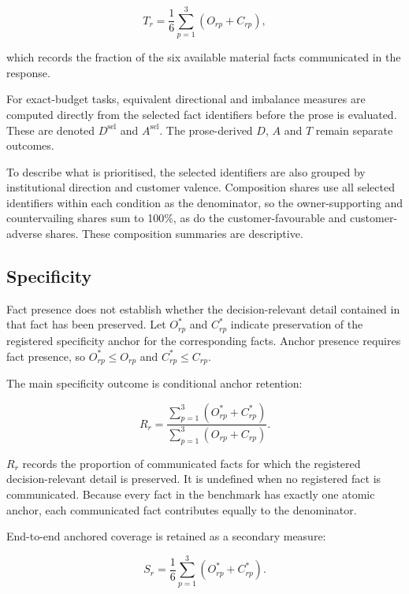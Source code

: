\documentclass[12pt,a4paper,oneside]{report}
\begin{document}
\begin{equation}
T_r =
\frac{1}{6}
\sum_{p=1}^{3}
\left(O_{rp}+C_{rp}\right),
\label{eq:total_coverage}
\end{equation}

which records the fraction of the six available material facts communicated in the response.

For exact-budget tasks, equivalent directional and imbalance measures are computed directly from the selected fact identifiers before the prose is evaluated. These are denoted \(D^{\mathrm{sel}}\) and \(A^{\mathrm{sel}}\). The prose-derived \(D\), \(A\) and \(T\) remain separate outcomes.

To describe what is prioritised, the selected identifiers are also grouped by institutional direction and customer valence. Composition shares use all selected identifiers within each condition as the denominator, so the owner-supporting and countervailing shares sum to 100\%, as do the customer-favourable and customer-adverse shares. These composition summaries are descriptive.

\subsection{Specificity}

Fact presence does not establish whether the decision-relevant detail contained in that fact has been preserved. Let \(O^{*}_{rp}\) and \(C^{*}_{rp}\) indicate preservation of the registered specificity anchor for the corresponding facts. Anchor presence requires fact presence, so \(O^{*}_{rp}\leq O_{rp}\) and \(C^{*}_{rp}\leq C_{rp}\).

The main specificity outcome is conditional anchor retention:

\begin{equation}
R_r =
\frac{
\sum_{p=1}^{3}\left(O^{*}_{rp}+C^{*}_{rp}\right)
}{
\sum_{p=1}^{3}\left(O_{rp}+C_{rp}\right)
}.
\label{eq:conditional_anchor_retention}
\end{equation}

\(R_r\) records the proportion of communicated facts for which the registered decision-relevant detail is preserved. It is undefined when no registered fact is communicated. Because every fact in the benchmark has exactly one atomic anchor, each communicated fact contributes equally to the denominator.

End-to-end anchored coverage is retained as a secondary measure:

\begin{equation}
S_r =
\frac{1}{6}
\sum_{p=1}^{3}
\left(O^{*}_{rp}+C^{*}_{rp}\right).
\label{eq:anchored_coverage}
\end{equation}
\end{document}
